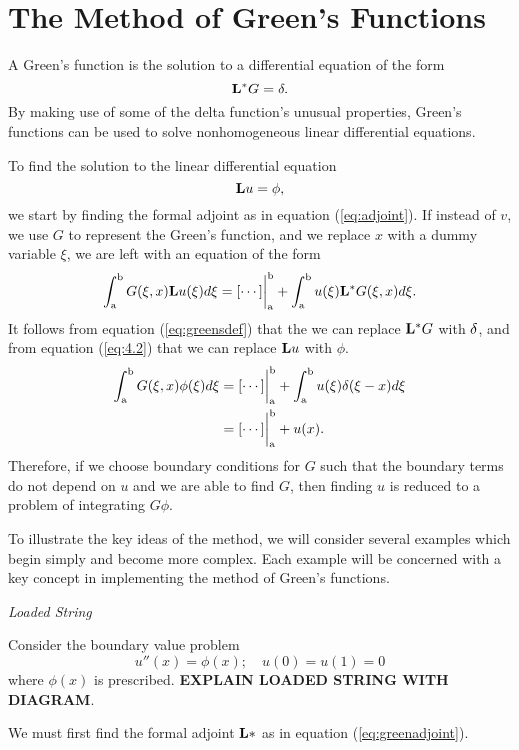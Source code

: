 \section{The Method of Green's Functions}
A Green's function is the solution to a differential equation of the form
\begin{equation} \label{eq:greensdef}
    \mathrm{\bf{L^*}} G = \delta.
\end{equation}
By making use of some of the delta function's unusual properties, Green's functions can be used to solve nonhomogeneous linear differential equations.

To find the solution to the linear differential equation
\begin{equation} \label{eq:4.2}
    \mathrm{\bf{L}}u=\phi,
\end{equation}
we start by finding the formal adjoint as in equation (\ref{eq:adjoint}). If instead of \(v\), we use \(G\) to represent the Green's function, and we replace \(x\) with a dummy variable \(\xi\), we are left with an equation of the form
\begin{equation} \label{eq:greenadjoint}
    \int_\mathrm{a}^\mathrm{b} G(\xi, x)\mathrm{\bf{L}}u(\xi) d\xi = [\cdots]\biggr\rvert_\mathrm{a}^\mathrm{b} + \int_\mathrm{a}^\mathrm{b} u(\xi)\mathrm{\bf{L^*}}G(\xi,x) d\xi.
\end{equation} 
It follows from equation (\ref{eq:greensdef}) that the we can replace \(\mathrm{\bf{L^*}}G\) with \(\delta\), and from equation (\ref{eq:4.2}) that we can replace \(\mathrm{\bf{L}}u\) with \(\phi\). 
\begin{equation}
    \begin{split}
        \int_\mathrm{a}^\mathrm{b} G(\xi,x)\phi(\xi) d\xi &= [\cdots]\biggr\rvert_\mathrm{a}^\mathrm{b} + \int_\mathrm{a}^\mathrm{b} u(\xi)\delta(\xi-x) d\xi\\
        &=[\cdots]\biggr\rvert_\mathrm{a}^\mathrm{b} + u(x).
    \end{split}
\end{equation}
Therefore, if we choose boundary conditions for \(G\) such that the boundary terms do not depend on \(u\) and we are able to find \(G\), then finding \(u\) is reduced to a problem of integrating \(G\phi\). 

To illustrate the key ideas of the method, we will consider several examples which begin simply and become more complex. Each example will be concerned with a key concept in implementing the method of Green's functions.
\begin{example} %
    \textit{Loaded String}
    
    Consider the boundary value problem
    \begin{equation}
        u''(x) = \phi(x);\quad u(0)=u(1)=0
    \end{equation}
    where \(\phi(x)\) is prescribed. \textbf{EXPLAIN LOADED STRING WITH DIAGRAM}. 
    
    We must first find the formal adjoint \(\mathrm{\bf{L}}*\) as in equation (\ref{eq:greenadjoint}). 
\end{example}
